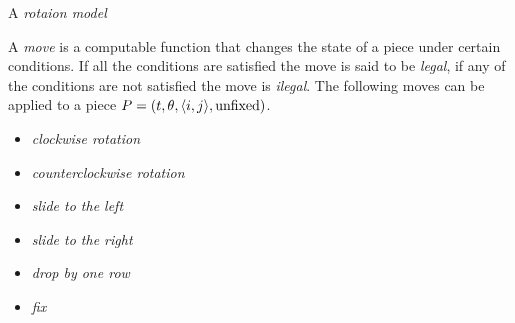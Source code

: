\begin{definition}
  A \emph{rotaion model}
\end{definition}

\begin{definition}
  A \emph{move} is a computable function that changes the state of a piece under certain conditions. If all the conditions are satisfied the move is said to be \emph{legal}, if any of the conditions are not satisfied the move is \emph{ilegal}. The following moves can be applied to a piece $P = \piece[t][\theta][i][j][\text{unfixed}]$. 
  \begin{itemize}
    \item \emph{clockwise rotation}
    \item \emph{counterclockwise rotation}
    \item \emph{slide to the left}
    \item \emph{slide to the right}
    \item \emph{drop by one row}
    \item \emph{fix}
  \end{itemize}
\end{definition}


